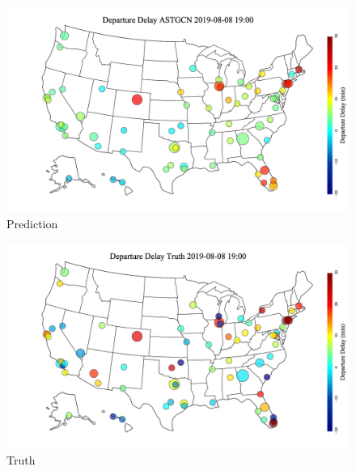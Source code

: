 \documentclass[conference]{IEEEtran}
\begin{document}

\begin{figure}[h]
    \centering
    \includegraphics[width=1\linewidth]{us_ASTGCN_7.png}
    \caption{Prediction}
    \label{fig:Prediction}
\end{figure}

\begin{figure}[h]
    \centering
    \includegraphics[width=1\linewidth]{us_Truth_7.png}
    \caption{Truth}
    \label{fig:Truth}
\end{figure}
\end{document}
